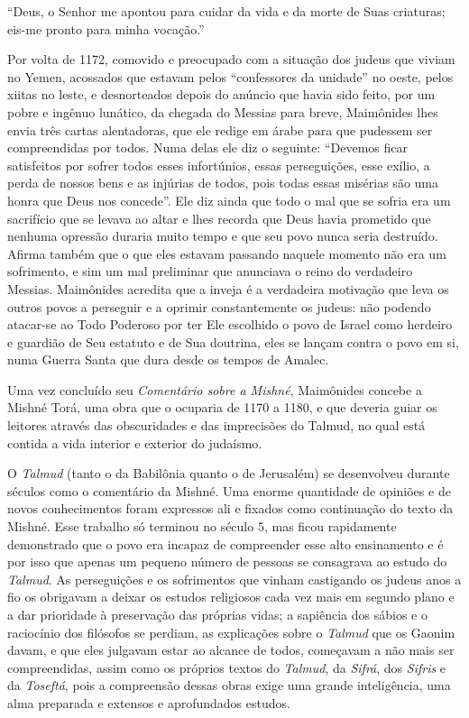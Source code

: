 ``Deus, o Senhor me apontou para cuidar da vida e da morte de Suas
criaturas; eis-me pronto para minha vocação.''

Por volta de 1172, comovido e preocupado com a situação dos judeus que
viviam no Yemen, acossados que estavam pelos ``confessores da unidade''
no oeste, pelos xiitas no leste, e desnorteados depois do anúncio que
havia sido feito, por um pobre e ingênuo lunático, da chegada do Messias
para breve, Maimônides lhes envia três cartas alentadoras, que ele
redige em árabe para que pudessem ser compreendidas por todos. Numa
delas ele diz o seguinte: ``Devemos ficar satisfeitos por sofrer todos
esses infortúnios, essas perseguições, esse exílio, a perda de nossos
bens e as injúrias de todos, pois todas essas misérias são uma honra que
Deus nos concede''. Ele diz ainda que todo o mal que se sofria era um
sacrifício que se levava ao altar e lhes recorda que Deus havia
prometido que nenhuma opressão duraria muito tempo e que seu povo nunca
seria destruído. Afirma também que o que eles estavam passando naquele
momento não era um sofrimento, e sim um mal preliminar que anunciava o
reino do verdadeiro Messias. Maimônides acredita que a inveja é a
verdadeira motivação que leva os outros povos a perseguir e a oprimir
constantemente os judeus: não podendo atacar-se ao Todo Poderoso por
ter Ele escolhido o povo de Israel como herdeiro e guardião de Seu
estatuto e de Sua doutrina, eles se lançam contra o povo em si, numa
Guerra Santa que dura desde os tempos de Amalec.

Uma vez concluído seu \emph{Comentário sobre a Mishné}, Maimônides
concebe a Mishné Torá, uma obra que o ocuparia de 1170 a 1180, e
que deveria guiar os leitores através das obscuridades e das
imprecisões do Talmud, no qual está contida a vida interior e exterior
do judaísmo.

O \emph{Talmud} (tanto o da Babilônia quanto o de Jerusalém) se
desenvolveu durante séculos como o comentário da Mishné. Uma
enorme quantidade de opiniões e de novos conhecimentos foram expressos
ali e fixados como continuação do texto da Mishné. Esse trabalho
só terminou no século 5, mas ficou rapidamente demonstrado que o povo
era incapaz de compreender esse alto ensinamento e é por isso que apenas
um pequeno número de pessoas se consagrava ao estudo do \emph{Talmud}.
As perseguições e os sofrimentos que vinham castigando os judeus anos a
fio os obrigavam a deixar os estudos religiosos cada vez mais em segundo
plano e a dar prioridade à preservação das próprias vidas; a sapiência
dos sábios e o raciocínio dos filósofos se perdiam, as explicações sobre
o \emph{Talmud} que os Gaonim davam, e que eles julgavam estar ao
alcance de todos, começavam a não mais ser compreendidas, assim como os
próprios textos do \emph{Talmud}, da \emph{Sifrá}, dos \emph{Sifris} e
da \emph{Toseftá}, pois a compreensão dessas obras exige uma grande
inteligência, uma alma preparada e extensos e aprofundados estudos.

